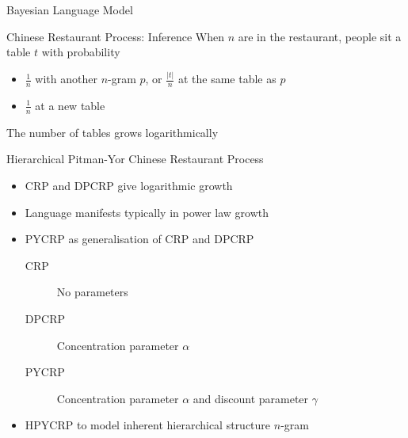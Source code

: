 \begin{frame}{Bayesian Language Model}
    \begin{block}{Chinese Restaurant Process: Inference}
        When $n$ are in the restaurant, people sit a table $t$ with probability
        \begin{itemize}
            \item $\frac{1}{n}$ with another $n$-gram $p$, or $\frac{|t|}{n}$ at the same table as $p$
            \item $\frac{1}{n}$ at a new table
        \end{itemize}
        The number of tables grows logarithmically
    \end{block}

    \begin{block}{Hierarchical Pitman-Yor Chinese Restaurant Process}
        \begin{itemize}
            \item CRP and DPCRP give logarithmic growth
            \item Language manifests typically in power law growth
            \item PYCRP as generalisation of CRP and DPCRP
            \begin{description}
                \item[CRP] No parameters
                \item[DPCRP] Concentration parameter $\alpha$
                \item[PYCRP] Concentration parameter $\alpha$ and discount parameter $\gamma$
            \end{description}
            \item HPYCRP to model inherent hierarchical structure $n$-gram
        \end{itemize}
    \end{block}
\end{frame}
\note[itemize]{
}

